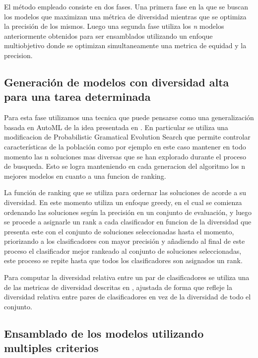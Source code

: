 \documentclass[runningheads,a4paper]{llncs}
\begin{document}
	El método empleado consiste en dos fases. Una primera fase en la que se buscan los modelos que
	maximizan una métrica de diversidad mientras que se optimiza la precisión de los mismos. Luego una
	segunda fase utiliza los \emph{n} modelos anteriormente obtenidos para ser ensamblados utilizando un
	enfoque multiobjetivo donde se optimizan simultaneamente una metrica de equidad y la precision.
	
	\subsection*{Generación de modelos con diversidad alta para una tarea determinada}
	
	Para esta fase utilizamos una tecnica que puede pensarse como una generalización basada en AutoML de
	la idea presentada en \cite{SnapshotEnsembles}. En particular se utiliza una modificacion de
	Probabilistic Gramatical Evolution Search que permite controlar características de la población como
	por ejemplo en este caso mantener en todo momento las n soluciones mas diversas que se han explorado
	durante el proceso de busqueda. Esto se logra manteniendo en cada generacion del algoritmo los n mejores
	modelos en cuanto a una funcion de ranking.
	
	La función de ranking que se utiliza para ordernar las soluciones de acorde a su diversidad. En este
	momento utiliza un enfoque greedy, en el cual se comienza ordenando las soluciones según la precisión
	en un conjunto de evaluación, y luego se procede a asignarle un rank a cada clasificador en funcion
	de la diversidad que presenta este con el conjunto de soluciones seleccionadas hasta el momento,
	priorizando a los clasificadores con mayor precisión y añadiendo al final de este proceso el
	clasificador mejor rankeado al conjunto de soluciones seleccionadas, este proceso se repite hasta
	que todos los clasificadores son asignados un rank.
	
	Para computar la diversidad relativa entre un par de clasificadores se utiliza una de las metricas
	de diversidad descritas en \cite{DiversityMeassures}, ajustada de forma que refleje la diversidad
	relativa entre pares de clasificadores en vez de la diversidad de todo el conjunto.
	
	\subsection*{Ensamblado de los modelos utilizando multiples criterios}
	
\end{document}
